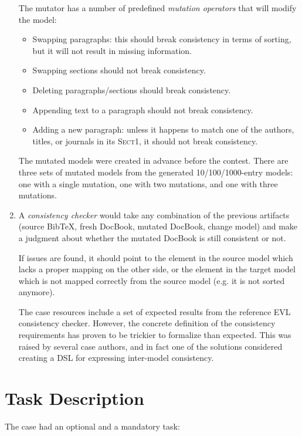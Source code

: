 \documentclass[a4paper]{article}
\newcommand*{\class}[1]{\textsc{#1}}
\begin{document}
\begin{enumerate}
  The mutator has a number of predefined \emph{mutation operators} that will
  modify the model:

\begin{itemize}
\item Swapping paragraphs: this should break consistency in terms of sorting,
  but it will not result in missing information.
\item Swapping sections should not break consistency.
\item Deleting paragraphs/sections should break consistency.
\item Appending text to a paragraph should not break consistency.
\item Adding a new paragraph: unless it happens to match one of the authors,
  titles, or journals in its \class{Sect1}, it should not break consistency.
\end{itemize}

The mutated models were created in advance before the contest. There are three
sets of mutated models from the generated 10/100/1000-entry models: one with a
single mutation, one with two mutations, and one with three mutations.

\item A \emph{consistency checker} would take any combination of the previous
  artifacts (source BibTeX, fresh DocBook, mutated DocBook, change model) and
  make a judgment about whether the mutated DocBook is still consistent or not.

  If issues are found, it should point to the element in the source model which
  lacks a proper mapping on the other side, or the element in the target model
  which is not mapped correctly from the source model (e.g. it is not sorted
  anymore).

  The case resources include a set of expected results from the reference EVL
  consistency checker. However, the concrete definition of the consistency
  requirements has proven to be trickier to formalize than expected. This was
  raised by several case authors, and in fact one of the solutions considered
  creating a DSL for expressing inter-model consistency.
\end{enumerate}

\section{Task Description}
\label{sec:task-description}

The case had an optional and a mandatory task:
\end{document}
